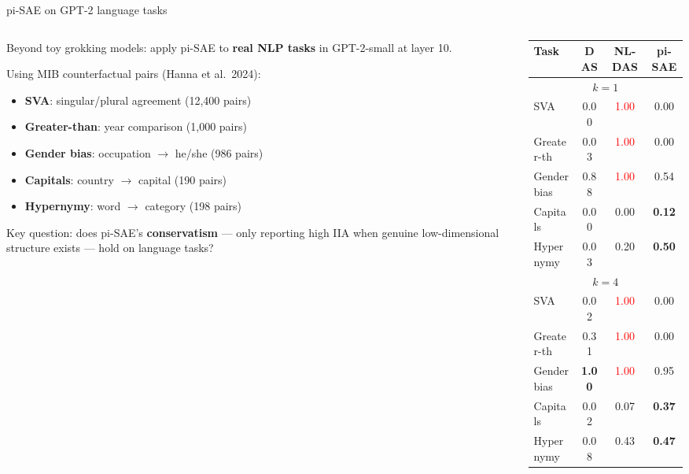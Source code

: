 \documentclass[aspectratio=169,11pt]{beamer}
\begin{document}
\begin{frame}{pi-SAE on GPT-2 language tasks}

\begin{columns}[T]
\begin{column}{0.55\textwidth}
{\small Beyond toy grokking models: apply pi-SAE to \textbf{real NLP tasks} in GPT-2-small at layer 10.}

\vspace{0.3em}
{\small Using MIB counterfactual pairs (Hanna et al.\ 2024):}
\begin{itemize}
  \item {\small \textbf{SVA}: singular/plural agreement (12,400 pairs)}
  \item {\small \textbf{Greater-than}: year comparison (1,000 pairs)}
  \item {\small \textbf{Gender bias}: occupation $\to$ he/she (986 pairs)}
  \item {\small \textbf{Capitals}: country $\to$ capital (190 pairs)}
  \item {\small \textbf{Hypernymy}: word $\to$ category (198 pairs)}
\end{itemize}

\vspace{0.3em}
{\small Key question: does pi-SAE's \textbf{conservatism} --- only reporting high IIA when genuine low-dimensional structure exists --- hold on language tasks?}
\end{column}
\begin{column}{0.44\textwidth}
{\scriptsize\centering
\renewcommand{\arraystretch}{1.15}
\begin{tabular}{l|ccc}
\toprule
\textbf{Task} & \textbf{DAS} & \textbf{NL-DAS} & \textbf{pi-SAE} \\
\midrule
\multicolumn{4}{c}{\textit{$k = 1$}} \\
\midrule
SVA        & 0.00 & \textcolor{red}{1.00} & 0.00 \\
Greater-th & 0.03 & \textcolor{red}{1.00} & 0.00 \\
Gender bias& 0.88 & \textcolor{red}{1.00} & 0.54 \\
Capitals   & 0.00 & 0.00 & \textbf{0.12} \\
Hypernymy  & 0.03 & 0.20 & \textbf{0.50} \\
\midrule
\multicolumn{4}{c}{\textit{$k = 4$}} \\
\midrule
SVA        & 0.02 & \textcolor{red}{1.00} & 0.00 \\
Greater-th & 0.31 & \textcolor{red}{1.00} & 0.00 \\
Gender bias& \textbf{1.00} & \textcolor{red}{1.00} & 0.95 \\
Capitals   & 0.02 & 0.07 & \textbf{0.37} \\
Hypernymy  & 0.08 & 0.43 & \textbf{0.47} \\
\bottomrule
\end{tabular}
}


\end{column}
\end{columns}
\end{frame}
\end{document}
